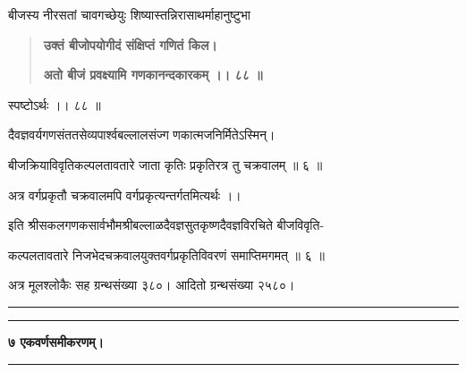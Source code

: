 \documentclass[11pt, openany]{book}
\begin{document}
\begin{sloppypar}
\hangindent=0.2in बीजस्य नीरसतां चावगच्छेयुः शिष्यास्तन्निरासाथर्माहानुष्टुभा\textendash

\begin{quote}
\hspace{1in}\textbf{उक्तं बीजोपयोगीदं संक्षिप्तं गणितं किल।}

\hspace{1in}\textbf{अतो बीजं प्रवक्ष्यामि गणकानन्दकारकम् ।। ८८ ॥}
\end{quote}

\hangindent=0.2in \hspace{0.2in}स्पष्टोऽर्थः ।। ८८ ॥

\hangindent=0.2in \hspace{0.2in}दैवज्ञवर्यगणसंततसेव्यपार्श्वबल्लालसंज्ग णकात्मजनिर्मितेऽस्मिन्।

\hangindent=0.2in \hspace{0.4in}बीजक्रियाविवृतिकल्पलतावतारे जाता कृतिः प्रकृतिरत्र तु चक्रवालम् ॥ ६ ॥

\hangindent=0.2in \hspace{0.2in}अत्र वर्गप्रकृतौ चक्रवालमपि वर्गप्रकृत्यन्तर्गतमित्यर्थः ।।

\begin{center}
इति श्रीसकलगणकसार्वभौमश्रीबल्लाळदैवज्ञसुतकृष्णदैवज्ञविरचिते बीजविवृति-

कल्पलतावतारे निजभेदचक्रवालयुक्तवर्गप्रकृतिविवरणं समाप्तिमगमत् ॥ ६ ॥

अत्र मूलश्लोकैः सह ग्रन्थसंख्या ३८०। आदितो ग्रन्थसंख्या २५८०।

\vspace{10mm}

\rule{0.3\linewidth}{0.5pt}

\vspace{-5mm}

\rule{0.3\linewidth}{0.5pt}
\end{center}
\end{sloppypar}
\thispagestyle{empty}
\newpage

\onehalfspacing
\begin{center}
\textbf{७ एकवर्णसमीकरणम्।}

\rule{0.1\linewidth}{0.5pt}
\end{center}
\end{document}
